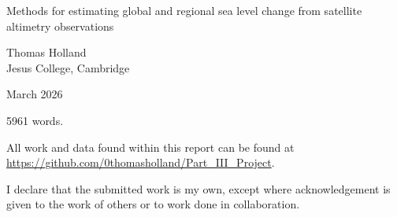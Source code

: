 \begin{titlepage}
  {
    \vspace*{5cm}
    \centering
    {\Huge Methods for estimating global and regional sea level change from satellite altimetry observations}\par
    \vspace*{\fill}
    \Large{Thomas Holland\\ Jesus College, Cambridge}\par
    \vspace{1cm}
    \large{March 2026}
    \restoregeometry
  }
\end{titlepage}

\clearpage
\thispagestyle{empty}

\begin{center}
  \vspace*{\fill}

  {5961 words.}

  \vspace{12pt}

  All work and data found within this report can be found at \url{https://github.com/0thomasholland/Part_III_Project}.

  \vspace{12pt}

  I declare that the submitted work is my own, except where
  acknowledgement is given to the work of others or to work done in
  collaboration.

\end{center}